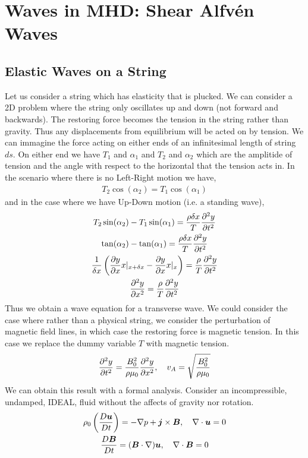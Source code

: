 \documentclass{article}
\begin{document}
\section{Waves in MHD: Shear Alfv\'en Waves}

\subsection{Elastic Waves on a String}
Let us consider a string which has elasticity that is plucked. We can consider a
2D problem where the string only oscillates up and down (not forward and
backwards). The restoring force becomes the tension in the string rather than
gravity. Thus any displacements from equilibrium will be acted on by tension. We
can immagine the force acting on either ends of an infinitesimal length of
string $ds$. On either end we have $T_1$ and $\alpha_1$ and $T_2$ and $\alpha_2$
which  are the amplitide of tension and the angle with respect to the horizontal
that the tension acts in. In the scenario where there is no Left-Right motion we
have, 
\begin{gather*}
    T_2\cos(\alpha_2) = T_1\cos(\alpha_1)
\end{gather*}
and in the case where we have Up-Down motion (i.e. a standing wave), 
\begin{gather*}
    T_2\sin(\alpha_2) - T_1\sin(\alpha_1) = \frac{\rho \delta x}{T}\frac{\partial^2 y}{\partial t^2}\\
    \tan(\alpha_2)-\tan(\alpha_1) = \frac{\rho \delta x}{T}\frac{\partial^2 y}{\partial t^2}\\
    \frac{1}{\delta x}\left( \frac{\partial y}{\partial x}{x}|_{x+\delta x} - \frac{\partial y}{\partial x}{x}|_{x}\right) =
    \frac{\rho}{T}\frac{\partial^2 y}{\partial t^2}\\
    \frac{\partial^2 y}{\partial x^2} = \frac{\rho}{T}\frac{\partial^2 y}{\partial t^2}
\end{gather*}
Thus we obtain a wave equation for a transverse wave. We could consider the case
where rather than a physical string, we consider the perturbation of magnetic
field lines, in which case the restoring force is magnetic tension. In this case
we replace the dummy variable $T$ with magnetic tension. 
\begin{gather*}
    \frac{\partial^2 y}{\partial t^2} = \frac{B_0^2}{\rho\mu_0}\frac{\partial^2 y}{\partial x^2}, \quad v_A =
    \sqrt{\frac{B_0^2}{\rho\mu_0}}
\end{gather*}
We can obtain this result with a formal analysis. Consider an incompressible,
undamped, IDEAL, fluid without the affects of gravity nor rotation. 
\begin{gather*}
    \rho_0\left(\frac{D \boldsymbol{u}}{D t}\right) = -\nabla p + \boldsymbol{j}\times\boldsymbol{B}, \quad \nabla \cdot{\boldsymbol{u}}
    = 0\\
    \frac{D \boldsymbol{B}}{D t} = (\boldsymbol{B}\cdot\nabla)\boldsymbol{u}, \quad \nabla \cdot{\boldsymbol{B}} = 0
\end{gather*}
\end{document}
